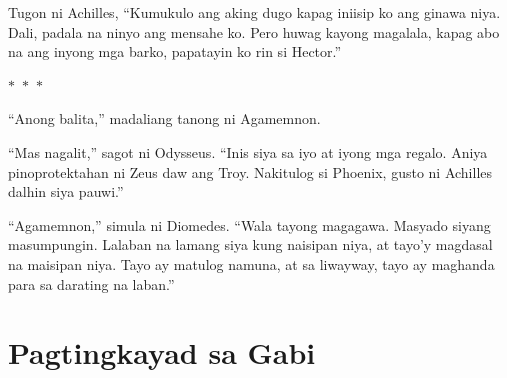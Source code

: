 \documentclass[12pt,letterpaper]{report}
\newcommand{\seperate}{\begin{center}$\ast$~$\ast$~$\ast$\end{center}}
\begin{document}
Tugon ni Achilles, ``Kumukulo ang aking dugo kapag iniisip ko ang ginawa niya. Dali, padala na ninyo ang mensahe ko. Pero huwag kayong magalala, kapag abo na ang inyong mga barko, papatayin ko rin si Hector.''

\seperate

``Anong balita,'' madaliang tanong ni Agamemnon.

``Mas nagalit,'' sagot ni Odysseus. ``Inis siya sa iyo at iyong mga regalo. Aniya pinoprotektahan ni Zeus daw ang Troy. Nakitulog si Phoenix, gusto ni Achilles dalhin siya pauwi.''

``Agamemnon,'' simula ni Diomedes. ``Wala tayong magagawa. Masyado siyang masumpungin. Lalaban na lamang siya kung naisipan niya, at tayo'y magdasal na maisipan niya. Tayo ay matulog namuna, at sa liwayway, tayo ay maghanda para sa darating na laban.''
\pagebreak
\chapter{Pagtingkayad sa Gabi}
\end{document}
